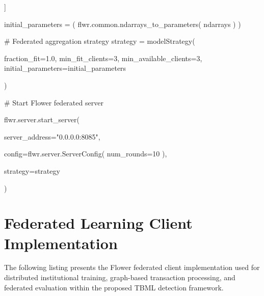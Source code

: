 \begin{tcblisting}
    ]

    initial_parameters = (
        flwr.common.ndarrays_to_parameters(
            ndarrays
        )
    )

    # Federated aggregation strategy
    strategy = modelStrategy(

        fraction_fit=1.0,
        min_fit_clients=3,
        min_available_clients=3,
        initial_parameters=initial_parameters

    )

    # Start Flower federated server

    flwr.server.start_server(

        server_address="0.0.0.0:8085",

        config=flwr.server.ServerConfig(
            num_rounds=10
        ),

        strategy=strategy

    )

\end{tcblisting}


\section{Federated Learning Client Implementation}

The following listing presents the Flower federated client implementation used for distributed institutional training, graph-based transaction processing, and federated evaluation within the proposed TBML detection framework.

